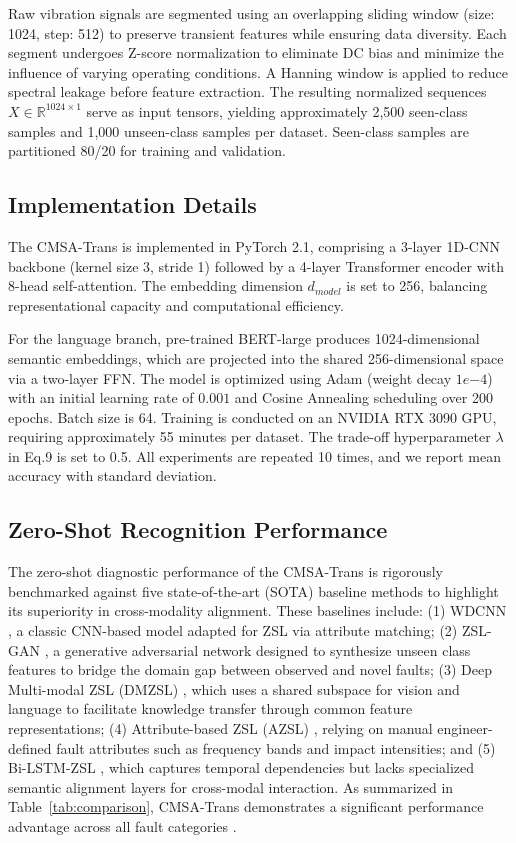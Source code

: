 Raw vibration signals are segmented using an overlapping sliding window (size: 1024, step: 512) to preserve transient features while ensuring data diversity. Each segment undergoes Z-score normalization to eliminate DC bias and minimize the influence of varying operating conditions. A Hanning window is applied to reduce spectral leakage before feature extraction. The resulting normalized sequences $X \in \mathbb{R}^{1024 \times 1}$ serve as input tensors, yielding approximately 2,500 seen-class samples and 1,000 unseen-class samples per dataset. Seen-class samples are partitioned 80/20 for training and validation.

\subsection{Implementation Details}
The CMSA-Trans is implemented in PyTorch 2.1, comprising a 3-layer 1D-CNN backbone (kernel size 3, stride 1) followed by a 4-layer Transformer encoder with 8-head self-attention. The embedding dimension $d_{model}$ is set to 256, balancing representational capacity and computational efficiency.

For the language branch, pre-trained BERT-large produces 1024-dimensional semantic embeddings, which are projected into the shared 256-dimensional space via a two-layer FFN. The model is optimized using Adam (weight decay $1e{-4}$) with an initial learning rate of $0.001$ and Cosine Annealing scheduling over 200 epochs. Batch size is 64. Training is conducted on an NVIDIA RTX 3090 GPU, requiring approximately 55 minutes per dataset. The trade-off hyperparameter $\lambda$ in Eq.9 is set to 0.5. All experiments are repeated 10 times, and we report mean accuracy with standard deviation.


\subsection{Zero-Shot Recognition Performance}
The zero-shot diagnostic performance of the CMSA-Trans is rigorously benchmarked against five state-of-the-art (SOTA) baseline methods to highlight its superiority in cross-modality alignment. These baselines include: (1) WDCNN \cite{zhang2017new}, a classic CNN-based model adapted for ZSL via attribute matching; (2) ZSL-GAN \cite{xian2019fvaegan}, a generative adversarial network designed to synthesize unseen class features to bridge the domain gap between observed and novel faults; (3) Deep Multi-modal ZSL (DMZSL) \cite{schonfeld2019generalized}, which uses a shared subspace for vision and language to facilitate knowledge transfer through common feature representations; (4) Attribute-based ZSL (AZSL) \cite{lampert2014attribute}, relying on manual engineer-defined fault attributes such as frequency bands and impact intensities; and (5) Bi-LSTM-ZSL \cite{chen2019bearing}, which captures temporal dependencies but lacks specialized semantic alignment layers for cross-modal interaction. As summarized in Table~\ref{tab:comparison}, CMSA-Trans demonstrates a significant performance advantage across all fault categories \cite{li2022zero, lu2017deep}.

